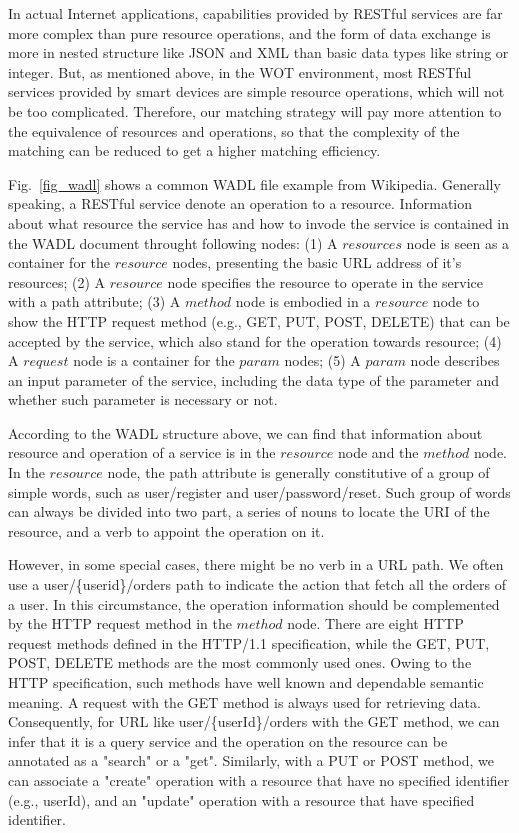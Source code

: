 In actual Internet applications, capabilities provided by RESTful services are far more complex than pure resource operations, and the form of data exchange is more in nested structure like JSON and XML than basic data types like string or integer. But, as mentioned above, in the WOT environment, most RESTful services provided by smart devices are simple  resource operations, which will not be too complicated. Therefore, our matching strategy will pay more attention to the  equivalence of resources and operations, so that the complexity of the matching can be reduced to get a higher matching efficiency. 

Fig.~\ref{fig_wadl} shows a common WADL file example from Wikipedia. Generally speaking, a RESTful service denote an operation to a resource. Information about what resource the service has and how to invode the service is contained in the WADL document throught following nodes: (1) A $resources$ node is seen as a container for the $resource$ nodes, presenting the basic URL address of it's resources; (2) A $resource$ node specifies the resource to operate in the service with a path attribute; (3) A $method$ node is embodied in a $resource$ node to show the HTTP request method (e.g., GET, PUT, POST, DELETE) that can be accepted by the service, which also stand for the operation towards resource; (4) A $request$ node is a container for the $param$ nodes; (5) A $param$ node describes an input parameter of the service, including the data type of the parameter and whether such parameter is necessary or not. 

According to the WADL structure above, we can find that information about resource and operation of a service is in the $resource$ node and the $method$ node. In the $resource$ node, the path attribute is generally constitutive of a group of simple words, such as user/register and user/password/reset. Such group of words can always be divided into two part, a series of nouns to locate the URI of the resource, and a verb to appoint the operation on it. 

However, in some special cases, there might be no verb in a URL path. We often use a user/\{userid\}/orders  path to indicate the action that fetch all the orders of a user. In this circumstance, the operation information should be complemented by the HTTP request method in the $method$ node. There are eight HTTP request methods defined in the HTTP/1.1 specification, while the GET, PUT, POST, DELETE methods are the most commonly used ones. Owing to the HTTP specification, such methods have well known and dependable semantic meaning. A request with the GET method is always used for retrieving data. Consequently, for URL like user/\{userId\}/orders with the GET method, we can infer that it is a query service and the operation on the resource can be annotated as a "search" or a "get". Similarly, with a PUT or POST method, we can associate a "create" operation with a resource that have no specified identifier (e.g., userId), and an "update" operation with a resource that have specified identifier. 

